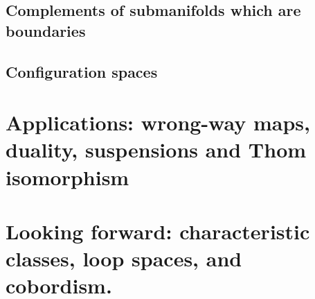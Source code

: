 \documentclass{amsart}          %
\begin{document}
\subsection{Complements of submanifolds which are boundaries}

\subsection{Configuration spaces}

\section{Applications: wrong-way maps, duality, suspensions and Thom isomorphism}

\section{Looking forward: characteristic classes, loop spaces, and cobordism.}

\nocite{*}


\printindex
\end{document}
